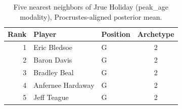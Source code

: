 \begin{table}[htbp]
  \centering\small
  \begin{tabular}{rllc}
    \toprule
    Rank & Player & Position & Archetype \\
    \midrule
    1 & Eric Bledsoe & G & 2 \\
    2 & Baron Davis & G & 2 \\
    3 & Bradley Beal & G & 2 \\
    4 & Anfernee Hardaway & G & 2 \\
    5 & Jeff Teague & G & 2 \\
    \bottomrule
  \end{tabular}
  \caption{Five nearest neighbors of Jrue Holiday (peak_age modality), Procrustes-aligned posterior mean.}
  \label{tab:Jrue_Holiday_neighbors_peak_age}
\end{table}

